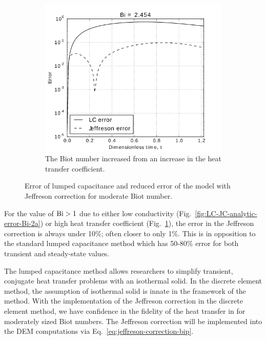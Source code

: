 \begin{figure}
        \begin{subfigure}[b]{0.5\textwidth}
                \includegraphics[width=\textwidth]{chapters/figures/LC-JC-analytic-error-Bi-2b}
                \caption{The Biot number increased from  an increase in the heat transfer coefficient.}
				\label{fig:LC-JC-analytic-error-Bi-2b}
        \end{subfigure}
        \caption[Error of lumped capacitance and Jeffreson correction for moderate Biot number]{Error of lumped capacitance and reduced error of the model with Jeffreson correction for moderate Biot number.}\label{fig:LC-JC-analytic-error-Bi-2}
\end{figure}

For the value of $\mathrm{Bi} > 1$ due to either low conductivity (Fig.~\ref{fig:LC-JC-analytic-error-Bi-2a}) or high heat transfer coefficient (Fig.~\ref{fig:LC-JC-analytic-error-Bi-2b}), the error in the Jeffreson correction is always under 10\%; often closer to only 1\%. This is in opposition to the standard lumped capacitance method which has 50-80\% error for both transient and steady-state values.

The lumped capacitance method allows researchers to simplify transient, conjugate heat transfer problems with an isothermal solid. In the discrete element method, the assumption of isothermal solid is innate in the framework of the method. With the implementation of the Jeffreson correction in the discrete element method, we have confidence in the fidelity of the heat transfer in for moderately sized Biot numbers. The Jeffreson correction will be implemented into the DEM computations via Eq.~\ref{eq:jeffreson-correction-bip}. 
